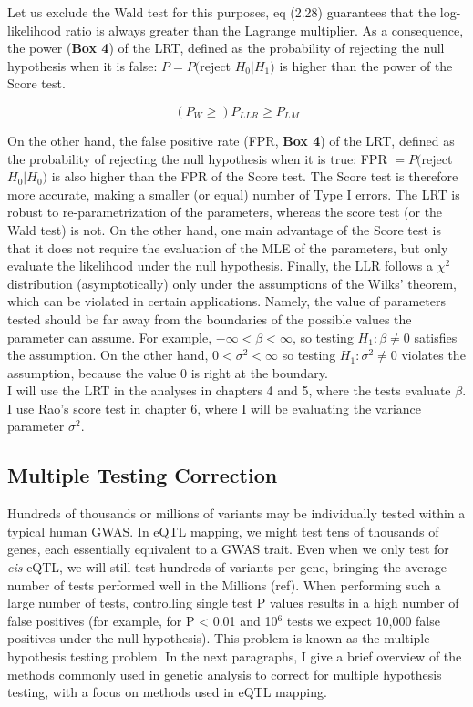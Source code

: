 Let us exclude the Wald test for this purposes, eq (2.28) guarantees that the log-likelihood ratio is always greater than the Lagrange multiplier.
As a consequence, the power (\textbf{Box 4}) of the LRT, defined as the probability of rejecting the null hypothesis when it is false: $P = P($reject $H_0 | H_1)$ is higher than the power of the Score test.

\begin{equation}
    (P_W \geq) P_{LLR} \geq P_{LM}
\end{equation}

On the other hand, the false positive rate (FPR, \textbf{Box 4}) of the LRT, defined as the probability of rejecting the null hypothesis when it is true: FPR $= P($reject $H_0 | H_0)$ is also higher than the FPR of the Score test.
The Score test is therefore more accurate, making a smaller (or equal) number of Type I errors. The LRT is robust to re-parametrization of the parameters, whereas the score test (or the Wald test) is not. On the other hand, one main advantage of the Score test is that it does not require the evaluation of the MLE of the parameters, but only evaluate the likelihood under the null hypothesis.
Finally, the LLR follows a $\chi^2$ distribution (asymptotically) only under the assumptions of the Wilks' theorem, which can be violated in certain applications.
Namely, the value of parameters tested should be far away from the boundaries of the possible values the parameter can assume.
For example, $-\infty < \beta < \infty$, so testing $H_1: \beta \neq 0$ satisfies the assumption.
On the other hand, $0 < \sigma^2 < \infty$ so testing $H_1: \sigma^2 \neq 0$ violates the assumption, because the value $0$ is right at the boundary.\\

I will use the LRT in the analyses in chapters 4 and 5, where the tests evaluate $\beta$.
I use Rao's score test in chapter 6, where I will be evaluating the variance parameter $\sigma^2$.


\subsection{Multiple Testing Correction}

Hundreds of thousands or millions of variants may be individually tested within a typical human GWAS. 
In eQTL mapping, we might test tens of thousands of genes, each essentially equivalent to a GWAS trait. 
Even when we only test for \textit{cis} eQTL, we will still test hundreds of variants per gene, bringing the average number of tests performed well in the Millions (ref).  
When performing such a large number of tests, controlling single test P values results in a high number of false positives (for example, for P < 0.01 and 10$^6$ tests we expect 10,000 false positives under the null hypothesis). 
This problem is known as the multiple hypothesis testing problem. 
In the next paragraphs, I give a brief overview of the methods commonly used in genetic analysis to correct for multiple hypothesis testing, with a focus on methods used in eQTL mapping.

